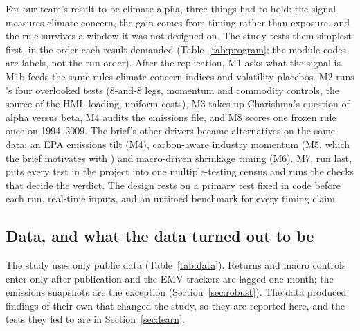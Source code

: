 For our team's result to be climate alpha, three things had to hold: the signal measures climate concern, the gain comes from timing rather than exposure, and the rule survives a window it was not designed on. The study tests them simplest first, in the order each result demanded (Table~\ref{tab:program}; the module codes are labels, not the run order). After the replication, M1 asks what the signal is. M1b feeds the same rules climate-concern indices and volatility placebos. M2 runs \CR's four overlooked tests (8-and-8 legs, momentum and commodity controls, the source of the HML loading, uniform costs), M3 takes up Charishma's question of alpha versus beta, M4 audits the emissions file, and M8 scores one frozen rule once on 1994--2009. The brief's other drivers became alternatives on the same data: an EPA emissions tilt (M4), carbon-aware industry momentum (M5, which the brief motivates with \citealp{za2024}) and macro-driven shrinkage timing (M6). M7, run last, puts every test in the project into one multiple-testing census and runs the checks that decide the verdict. The design rests on a primary test fixed in code before each run, real-time inputs, and an untimed benchmark for every timing claim.

\subsection{Data, and what the data turned out to be}
\label{sec:data}

The study uses only public data (Table~\ref{tab:data}). Returns and macro controls enter only after publication and the EMV trackers are lagged one month; the emissions snapshots are the exception (Section~\ref{sec:robust}). The data produced findings of their own that changed the study, so they are reported here, and the tests they led to are in Section~\ref{sec:learn}.

